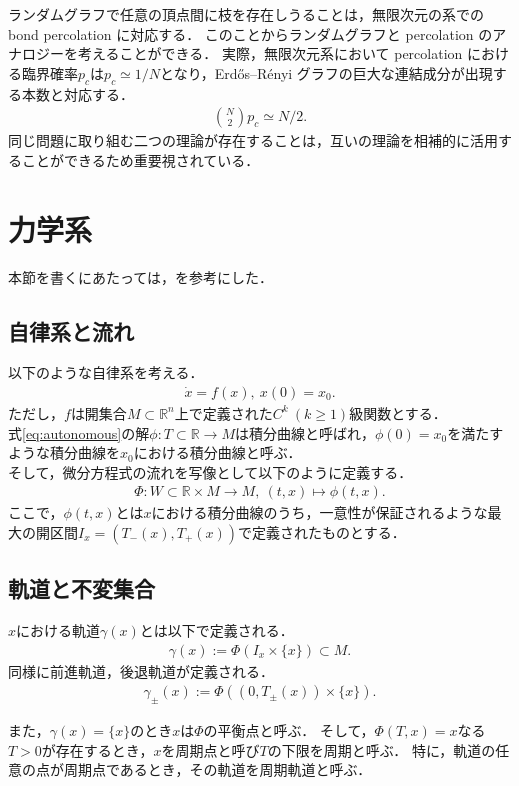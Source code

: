 \documentclass[../main]{subfiles}
\begin{document}
ランダムグラフで任意の頂点間に枝を存在しうることは，無限次元の系での bond percolation に対応する．
このことからランダムグラフと percolation のアナロジーを考えることができる．
実際，無限次元系において percolation における臨界確率$p_c$は$p_c\simeq 1/N$となり，Erdős–Rényi グラフの巨大な連結成分が出現する本数と対応する．
\begin{align*}
    \binom{N}{2}p_c\simeq N/2.
\end{align*}
同じ問題に取り組む二つの理論が存在することは，互いの理論を相補的に活用することができるため重要視されている．
\section{力学系}
本節を書くにあたっては，\cite{teschlordinary,Ciesielski+2012+2110+2128}を参考にした．
\subsection{自律系と流れ}
以下のような自律系を考える．
\begin{align}
    \label{eq:autonomous}
    \dot{x}=f(x),\ x(0)=x_0.
\end{align}
ただし，$f$は開集合$M\subset \mathbb{R}^n$上で定義された$C^k\ (k\geq 1)$級関数とする．\\
式\eqref{eq:autonomous}の解$\phi:T\subset \mathbb{R}\to M$は積分曲線と呼ばれ，$\phi(0)=x_0$を満たすような積分曲線を$x_0$における積分曲線と呼ぶ．\\
そして，微分方程式の流れを写像として以下のように定義する．
\begin{align}
    \Phi:W\subset\mathbb{R}\times M\to M,\ (t,x)\mapsto \phi(t,x).
\end{align}
ここで，$\phi(t,x)$とは$x$における積分曲線のうち，一意性が保証されるような最大の開区間$I_x=(T_-(x),T_+(x))$で定義されたものとする．
\subsection{軌道と不変集合}
$x$における軌道$\gamma(x)$とは以下で定義される．
\begin{align}
    \gamma(x):=\Phi(I_x\times \{x\})\subset M.
\end{align}
同様に前進軌道，後退軌道が定義される．
\begin{align}
    \gamma_\pm(x):=\Phi((0,T_\pm (x))\times \{x\}).
\end{align}

また，$\gamma(x)=\{x\}$のとき$x$は$\Phi$の平衡点と呼ぶ．
そして，$\Phi(T,x)=x$なる$T>0$が存在するとき，$x$を周期点と呼び$T$の下限を周期と呼ぶ．
特に，軌道の任意の点が周期点であるとき，その軌道を周期軌道と呼ぶ．
\end{document}
